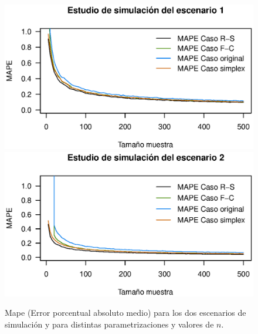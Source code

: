 \begin{figure}
	\begin{center}
		\includegraphics[scale=0.45]{Mape_gnrl.eps}	
		\quad
		\includegraphics[scale=0.45]{Mape_gnrl_infla.eps}
		\caption{Mape (Error porcentual absoluto medio) para los dos escenarios de simulaci\'{o}n y para distintas parametrizaciones y valores de $n$.}
		\label{Mapes}
	\end{center}
\end{figure}

